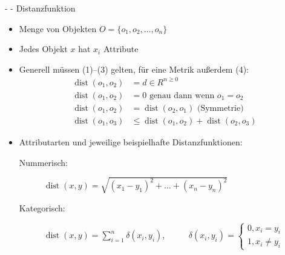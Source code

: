 \documentclass[fleqn,11pt,aspectratio=43]{beamer}
\DeclareMathOperator{\dist}{dist}
\begin{document}
\begin{frame}{\insertsectionhead - \insertsubsectionhead - Distanzfunktion \cite{ester2000knowledge}}
\begin{itemize} %
\item Menge von Objekten $O = \{o_1, o_2, \ldots, o_n\}$
\item Jedes Objekt $x$ hat $x_i$ Attribute
\item Generell müssen (1)--(3) gelten, für eine Metrik außerdem (4):
\begin{align}
\dist(o_1, o_2) &= d \in R^{n\geq 0}\\
\dist(o_1, o_2) &= 0 \mbox{ genau dann wenn } o_1 = o_2\\
\dist(o_1, o_2) &= \dist(o_2, o_1) \mbox{ (Symmetrie)}\\
\dist(o_1, o_3) &\leq \dist(o_1, o_2) + \dist(o_2, o_3)
\end{align}
\item Attributarten und jeweilige beispielhafte Distanzfunktionen:
\begin{description}  
\item[Nummerisch:] $\dist(x,y) = \sqrt{(x_1 - y_1)^2 + \ldots + (x_n - y_n)^2}$
\item[Kategorisch:] $\dist(x,y) = \sum\limits_{i=1}^{n}\delta(x_i, y_i)$,~~~~~ $\delta(x_i, y_i) = \begin{cases}
0  ,x_i = y_i\\
1  ,x_i \neq y_i
\end{cases} $
\end{description}
\end{itemize}
\end{frame}
\end{document}
